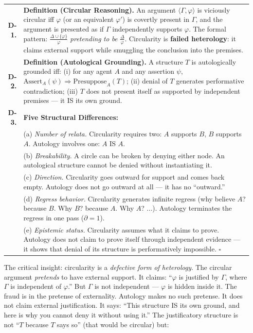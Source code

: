 \documentclass[10pt, openany, oneside]{book}
\renewcommand{\footnotesize}{\fontsize{8.5}{11}\selectfont}
\begin{document}
{\footnotesize
\noindent\begin{tabular}{r p{}}
\textbf{D-1.} & \textbf{Definition (Circular Reasoning).} An argument $\langle \Gamma, \varphi \rangle$ is viciously circular iff $\varphi$ (or an equivalent $\varphi'$) is covertly present in $\Gamma$, and the argument is presented as if $\Gamma$ independently supports $\varphi$. The formal pattern: $\frac{\Delta \cup \{\varphi\}}{\varphi}$ \textit{pretending to be} $\frac{\Delta}{\varphi}$. Circularity is \textbf{failed heterology}: it claims external support while smuggling the conclusion into the premises. \\[0.5em]
\textbf{D-2.} & \textbf{Definition (Autological Grounding).} A structure $T$ is autologically grounded iff: (i) for any agent $A$ and any assertion $\psi$, $\text{Assert}_A(\psi) \Rightarrow \text{Presuppose}_A(T)$; (ii) denial of $T$ generates performative contradiction; (iii) $T$ does not present itself as supported by independent premises --- it IS its own ground. \\[0.5em]
\textbf{D-3.} & \textbf{Five Structural Differences:} \\[0.3em]
& (a) \textit{Number of relata.} Circularity requires two: $A$ supports $B$, $B$ supports $A$. Autology involves one: $A$ IS $A$. \\[0.2em]
& (b) \textit{Breakability.} A circle can be broken by denying either node. An autological structure cannot be denied without instantiating it. \\[0.2em]
& (c) \textit{Direction.} Circularity goes outward for support and comes back empty. Autology does not go outward at all --- it has no ``outward.'' \\[0.2em]
& (d) \textit{Regress behavior.} Circularity generates infinite regress (why believe $A$? because $B$. Why $B$? because $A$. Why $A$? $\ldots$). Autology terminates the regress in one pass ($\partial = 1$). \\[0.2em]
& (e) \textit{Epistemic status.} Circularity assumes what it claims to prove. Autology does not claim to prove itself through independent evidence --- it shows that denial of its structure is performatively impossible. $\square$ \\[0.3em]
\end{tabular}
}

\vspace{0.8em}

\noindent The critical insight: circularity is a \textit{defective form of heterology}. The circular argument \textit{pretends} to have external support. It claims: ``$\varphi$ is justified by $\Gamma$, where $\Gamma$ is independent of $\varphi$.'' But $\Gamma$ is not independent --- $\varphi$ is hidden inside it. The fraud is in the pretense of externality. Autology makes no such pretense. It does not claim external justification. It says: ``This structure IS its own ground, and here is why you cannot deny it without using it.'' The justificatory structure is not ``$T$ because $T$ says so'' (that would be circular) but:
\end{document}
